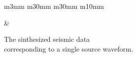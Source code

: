 \begin{figure}[t]
\begin{tabular}{m{3mm} m{30mm} m{30mm} m{10mm}}
\begin{minipage}[b]{\linewidth}
            \vspace{-7mm}
            \caption*{}
            \vspace{1mm}
        \end{minipage} &
        \hspace{-3mm}
         \\
    \end{tabular}
    \vspace{-4mm}
    \captionsetup{margin=1.3cm}
    \caption{The sinthesized seismic data \\ corresponding to a single source waveform.}
    \vspace{-5mm}
    \label{fig:observed-seismic-data}
\end{figure}
